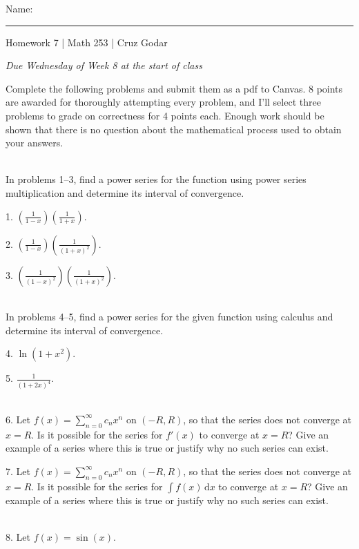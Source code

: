 \documentclass{article}
\begin{document}
\Large Name: \rule{2in}{0.15mm} \hfill Homework 7 | Math 253 | Cruz Godar \vspace{4pt}  \normalsize

\textit{Due Wednesday of Week 8 at the start of class}

Complete the following problems and submit them as a pdf to Canvas. 8 points are awarded for thoroughly attempting every problem, and I'll select three problems to grade on correctness for 4 points each. Enough work should be shown that there is no question about the mathematical process used to obtain your answers.

~\\

In problems 1--3, find a power series for the function using power series multiplication and determine its interval of convergence.

1. $\displaystyle \left( \frac{1}{1 - x} \right)\left( \frac{1}{1 + x} \right)$.

2. $\displaystyle \left( \frac{1}{1 - x} \right)\left( \frac{1}{(1 + x)^2} \right)$.

3. $\displaystyle \left( \frac{1}{(1 - x)^2} \right)\left( \frac{1}{(1 + x)^2} \right)$.

~\\

In problems 4--5, find a power series for the given function using calculus and determine its interval of convergence.

4. $\displaystyle \ln\left( 1 + x^2 \right)$.

5. $\displaystyle \frac{1}{(1 + 2x)^4}$.

~\\

6. Let $\displaystyle f(x) = \sum_{n = 0}^\infty c_n x^n$ on $(-R, R)$, so that the series does not converge at $x = R$. Is it possible for the series for $f'(x)$ to converge at $x = R$? Give an example of a series where this is true or justify why no such series can exist.

7. Let $\displaystyle f(x) = \sum_{n = 0}^\infty c_n x^n$ on $(-R, R)$, so that the series does not converge at $x = R$. Is it possible for the series for $\displaystyle \int f(x)\,\mathrm{d} x$ to converge at $x = R$? Give an example of a series where this is true or justify why no such series can exist.

~\\

8. Let $f(x) = \sin(x)$.
\end{document}
